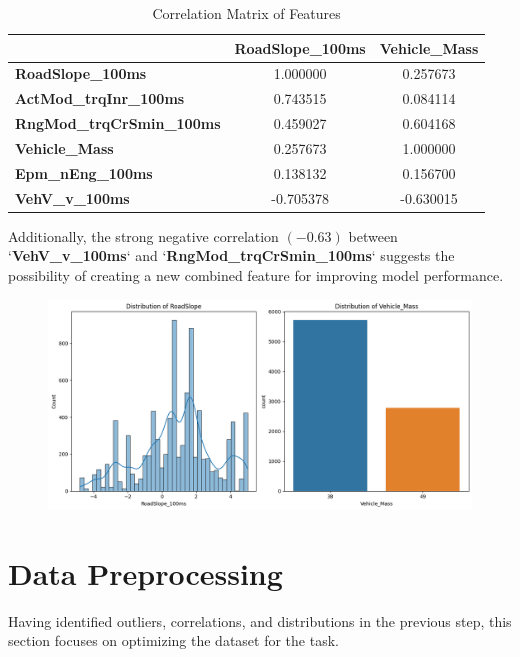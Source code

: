 \documentclass[conference]{IEEEtran}
\begin{document}
\begin{table}[ht]
    \centering
    \begin{tabular}{lcc}
      \toprule
      & \textbf{RoadSlope\_100ms} & \textbf{Vehicle\_Mass} \\
      \midrule
      \textbf{RoadSlope\_100ms} & 1.000000 & 0.257673 \\
      \textbf{ActMod\_trqInr\_100ms} & 0.743515 & 0.084114 \\
      \textbf{RngMod\_trqCrSmin\_100ms} & 0.459027 & 0.604168 \\
      \textbf{Vehicle\_Mass} & 0.257673 & 1.000000 \\
      \textbf{Epm\_nEng\_100ms} & 0.138132 & 0.156700 \\
      \textbf{VehV\_v\_100ms} & -0.705378 & -0.630015 \\
      \bottomrule
    \end{tabular}
    \vspace{0.5em}
    \caption{Correlation Matrix of Features}
    \label{tab:correlation}
\end{table}

Additionally, the strong negative correlation $(-0.63)$ between `\textbf{VehV\_v\_100ms}` and `\textbf{RngMod\_trqCrSmin\_100ms}` suggests the possibility of creating a new combined feature for improving model performance.

\begin{figure}[t]
    \centering
    \includegraphics[width=\textwidth, height=0.3\textheight]{Distribution.png}
    \label{fig:roadslopedistribution}
\end{figure}



\section{Data Preprocessing}
Having identified outliers, correlations, and distributions in the previous step, this section focuses on optimizing the dataset for the task. 
\end{document}
